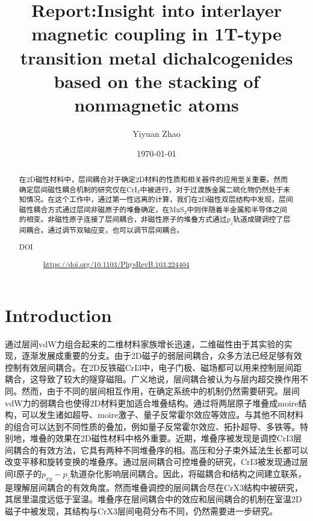 \documentclass[reprint, aps, prb, showkeys]{revtex4-2}
\begin{document}
\title{Report:Insight into interlayer magnetic coupling in 1T-type \\
transition metal dichalcogenides based on the stacking of nonmagnetic atoms}

\author{Yiyuan Zhao}
\date{\today}

\begin{abstract}
在2D磁性材料中，层间耦合对于确定2D材料的性质和相关器件的应用至关重要。然而确定层间磁性耦合机制的研究仅在CrI$_3$中被进行，对于过渡族金属二硫化物仍然处于未知情况。在这个工作中，通过第一性远离的计算，我们在2D磁性双层结构中发现，层间磁性耦合方式通过层间非磁原子的堆叠确定，在MnS$_2$中则伴随着半金属和半导体之间的相变。非磁性原子连接了层间耦合，非磁性原子的堆叠方式通过$p_z$轨道成键调控了层间耦合。通过调节双轴应变，也可以调节层间耦合。

\begin{description}
    \item[DOI] \url{https://doi.org/10.1103/PhysRevB.103.224404}
\end{description}
\end{abstract}


\maketitle

\section{Introduction}
通过层间vdW力组合起来的二维材料家族增长迅速，二维磁性由于其实验的实现，逐渐发展成重要的分支。由于2D磁子的弱层间耦合，众多方法已经足够有效控制有效层间耦合。在2D反铁磁CrI3中，电子门极、磁场都可以用来控制层间距耦合，这导致了较大的隧穿磁阻。广义地说，层间耦合被认为与层内超交换作用不同。然而，由于不同的层间相互作用，在确定系统中的机制仍然需要研究。层间vdW力的弱耦合也使得2D材料更加适合堆叠结构。通过将两层原子堆叠成moire结构，可以发生诸如超导、moire激子、量子反常霍尔效应等效应。与其他不同材料的组合可以达到不同性质的叠加，例如量子反常霍尔效应、拓扑超导、多铁等。特别地，堆叠的效果在2D磁性材料中格外重要。近期，堆叠序被发现是调控CrI3层间耦合的有效方法，它具有两种不同堆叠序的相。高压和分子束外延法生长都可以改变平移和旋转变换的堆叠序。通过层间耦合可控堆叠的研究，CrI3被发现通过层间I原子的$p_{xy} - p_z$轨道杂化影响层间耦合。因此，将磁耦合和结构之间建立联系，是理解层间耦合的有效角度。然而堆叠调控的层间耦合尽在CrX3结构中被研究，其居里温度远低于室温。堆叠序在层间耦合中的效应和层间耦合的机制在室温2D磁子中被发现，其结构与CrX3层间电荷分布不同，仍然需要进一步研究。
\end{document}

